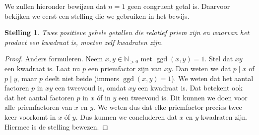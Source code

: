 \documentclass[12pt,reqno]{article}
\newcommand*{\NO}{\ensuremath{\mathbb{N}_{>0}}}
\theoremstyle{theorem}
\newtheorem{theorem}{Stelling}
\theoremstyle{definition}
\DeclareMathOperator{\ggd}{ggd}
\begin{document}
	We zullen hieronder bewijzen dat $n=1$ geen congruent getal is. Daarvoor bekijken we eerst een stelling die we gebruiken in het bewijs.
	\begin{theorem}\label{1:hulp}
		Twee positieve gehele getallen die relatief priem zijn en waarvan het product een kwadraat is, moeten zelf kwadraten zijn.
	\end{theorem}
	\begin{proof}
		{\color{red}Anders formuleren.} Neem $x,y\in\NO$ met $\ggd(x,y) = 1$. Stel dat $xy$ een kwadraat is. Laat nu $p$ een priemfactor zijn van $xy$. Dan weten we dat $p \mid x$ of $p \mid y$, maar $p$ deelt niet beide (immers $\ggd(x,y)=1$). We weten dat het aantal factoren $p$ in $xy$ een tweevoud is, omdat $xy$ een kwadraat is. Dat betekent ook dat het aantal factoren $p$ in $x$ \'of in $y$ een tweevoud is. Dit kunnen we doen voor alle priemfactoren van $x$ en $y$. We weten dus dat elke priemfactor precies twee keer voorkomt in $x$ \'of $y$. Dus kunnen we concluderen dat $x$ en $y$ kwadraten zijn. Hiermee is de stelling bewezen.
	\end{proof}
	
\end{document}
